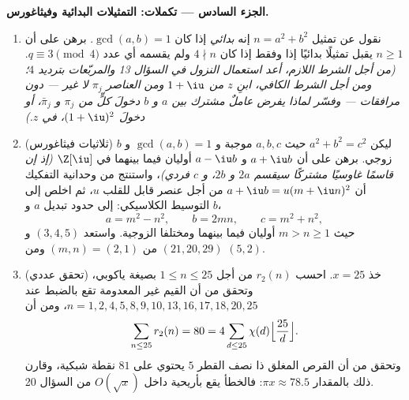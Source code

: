\begin{problem}
\medskip
\noindent\textbf{الجزء السادس --- تكملات: التمثيلات البدائية
وفيثاغورس.}
\begin{enumerate}[resume]
  \item نقول عن تمثيل $n = a^2 + b^2$ إنه \emph{بدائي} إذا كان
        $\gcd(a, b) = 1$. برهن على أن $n \geq 1$ يقبل تمثيلًا
        بدائيًا إذا وفقط إذا كان $4 \nmid n$ ولم يقسمه أي عدد
         $q \equiv 3 \pmod 4$. \emph{(من أجل الشرط اللازم، أعد استعمال
        النزول في السؤال 13 والمربّعات بترديد $4$؛ ومن أجل الشرط
        الكافي، ابنِ $z$ من $1 + \iu$ ومن العناصر $\pi_j$ لا
        غير --- دون مرافقات --- وفسّر لماذا يفرض عاملٌ  مشترك
        بين $a$ و $b$ دخولَ كلٍّ من $\pi_j$ و $\bar\pi_j$، أو
        دخولَ $(1+\iu)^2$، في $z$.)}
  \item (ثلاثيات فيثاغورس) ليكن $a^2 + b^2 = c^2$ حيث $a, b,
        c$ موجبة و
        $\gcd(a, b) = 1$ و $b$ زوجي. برهن على أن $a + \iu b$
        و $a - \iu b$ أوليان فيما بينهما في $\Z[\iu]$ \emph{(إذ
        إن قاسمًا غاوسيًا  مشتركًا سيقسم $2a$ و $2b$،
        و $c$ فردي)}، واستنتج من وحدانية التفكيك أن $a + \iu b = u(m + \iu n)^2$ من
        أجل عنصر قابل للقلب $u$، ثم اخلص إلى التوسيط الكلاسيكي:
        إلى حدود تبديل $a$ و $b$،
        \[
        a = m^2 - n^2, \qquad b = 2mn, \qquad c = m^2 + n^2,
        \]
        حيث $m > n \geq 1$ أوليان فيما بينهما ومختلفا الزوجية.
        واستعد $(3, 4, 5)$ و $(21, 20, 29)$ من $(m, n) =
        (2, 1)$ ومن
        $(5, 2)$.
  \item (تحقق عددي) خذ $x = 25$. احسب $r_2(n)$ من أجل $1 \leq n \leq 25$
        بصيغة ياكوبي، وتحقق من أن القيم غير المعدومة تقع بالضبط
        عند $n = 1,
        2, 4, 5, 8, 9, 10, 13, 16, 17, 18, 20, 25$، ومن أن
        \[
        \sum_{n \leq 25} r_2(n) = 80
        = 4\sum_{d \leq 25}\chi(d)
        \Bigl\lfloor\frac{25}d\Bigr\rfloor .
        \]
        وتحقق من أن القرص المغلق ذا نصف القطر $5$ يحتوي على $81$
        نقطة شبكية، وقارن ذلك بالمقدار $\pi x \approx 78.5$: فالخطأ يقع
        بأريحية داخل $O(\sqrt x)$ من السؤال 20.
\end{enumerate}
\end{problem}

